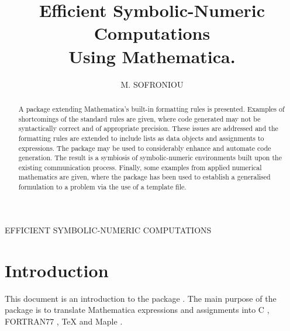 \documentclass [12pt,twoside]{article}
\begin{document}
\title{Efficient Symbolic-Numeric Computations\\
Using Mathematica.}

\pagestyle{myheadings}
         {\hfill \sc EFFICIENT SYMBOLIC-NUMERIC COMPUTATIONS\hfill}

\author{\sc M. SOFRONIOU\footnotemark[1]}

\date{}  %

\maketitle

\renewcommand{\thefootnote}{\fnsymbol{footnote}}


\renewcommand{\thefootnote}{\arabic{footnote}}

\begin{abstract}
A package  extending Mathematica's built-in formatting
rules is presented. Examples of shortcomings of the standard rules are given,
where code generated may not be syntactically correct and of appropriate
precision. These issues are addressed and the formatting rules are
extended to include lists as data objects and assignments to expressions.
The package may be used to considerably enhance and automate code generation.
The result is a symbiosis of symbolic-numeric environments built upon the existing
 communication process. Finally, some examples from applied numerical
mathematics are given, where the package has been used to establish a generalised
formulation to a problem via the use of a template file.

\end{abstract}
\thispagestyle{empty}
\vfill
\eject

\tableofcontents
\vfill
\eject

\setcounter{page}{1}

\section{Introduction}

This document is an introduction to the package . The main
purpose of the package is to translate Mathematica expressions and
assignments into C \cite{harbison-91}, FORTRAN77 \cite{meissner},
\TeX \cite{knuth-89} and Maple \cite{maple}.
\end{document}

